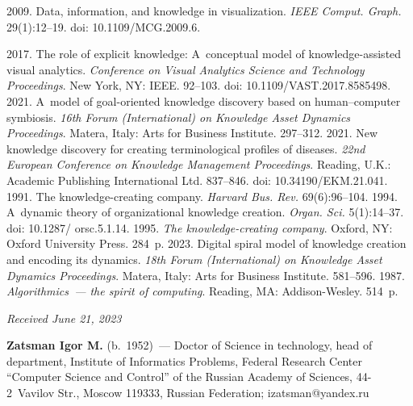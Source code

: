 \begin{multicols}{2}
{{\begin{thebibliography}{99}
 2009. Data, information, and knowledge in visualization. \textit{IEEE 
Comput. Graph.} 29(1):12--19. doi: 10.1109/MCG.2009.6.


 2017. The role of 
explicit knowledge: A~conceptual model of knowledge-assisted visual analytics. \textit{Conference on 
Visual Analytics Science and Technology Proceedings}. New York, NY: IEEE. 92--103. doi: 
10.1109/VAST.2017.8585498.
 2021. A~model of goal-oriented knowledge discovery based on human--computer 
symbiosis. \textit{16th Forum (International) on Knowledge Asset Dynamics Proceedings}. Matera, Italy: Arts for Business Institute. 297--312.
 2021. New knowledge discovery for creating terminological profiles 
of diseases. \textit{22nd European Conference on Knowledge Management Proceedings}. Reading, U.K.: 
Academic Publishing International Ltd. 837--846. doi: 10.34190/EKM.21.041.
 1991. The knowledge-creating company. \textit{Harvard Bus. Rev.} 69(6):96--104.
 1994. A~dynamic theory of organizational knowledge creation. \textit{Organ. Sci.} 
5(1):14--37. doi: 10.1287/ orsc.5.1.14.
 1995. \textit{The knowledge-creating company}. Oxford, NY: Oxford 
University Press. 284~p.
 2023. Digital spiral model of knowledge creation and encoding its dynamics. \textit{18th 
Forum (International) on Knowledge Asset Dynamics Proceedings}. Matera, Italy: Arts for Business Institute. 581--596.
 1987. \textit{Algorithmics~--- the spirit of computing}. Reading, MA: Addison-Wesley. 514~p.

\end{thebibliography}

 }
 }

\end{multicols}

\vspace*{-6pt}

\hfill{\small\textit{Received June 21, 2023}} 

\vspace*{-12pt}
      
\Contrl

\vspace*{-2pt}

\noindent
\textbf{Zatsman Igor M.} (b.\ 1952)~--- Doctor of Science in technology, head of department, Institute of 
Informatics Problems, Federal Research Center ``Computer Science and Control'' of the Russian Academy of 
Sciences, 44-2~Vavilov Str., Moscow 119333, Russian Federation; \mbox{izatsman@yandex.ru}



\label{end\stat}

\renewcommand{\bibname}{\protect\rm Литература} 